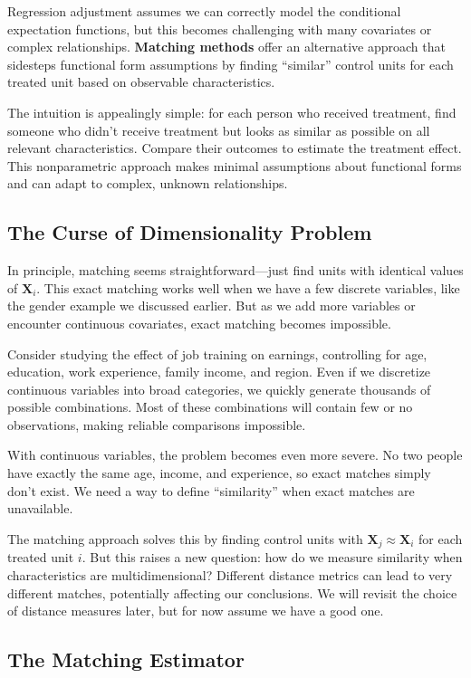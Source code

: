 \documentclass[12pt]{article}
\begin{document}
\begin{multicols}{2}
Regression adjustment assumes we can correctly model the conditional expectation functions, but this becomes challenging with many covariates or complex relationships.
\textbf{Matching methods} offer an alternative approach that sidesteps functional form assumptions by finding ``similar'' control units for each treated unit based on observable characteristics.

The intuition is appealingly simple: for each person who received treatment, find someone who didn't receive treatment but looks as similar as possible on all relevant characteristics.
Compare their outcomes to estimate the treatment effect.
This nonparametric approach makes minimal assumptions about functional forms and can adapt to complex, unknown relationships.

\subsection*{The Curse of Dimensionality Problem}

In principle, matching seems straightforward---just find units with identical values of $\bm{X}_i$.
This exact matching works well when we have a few discrete variables, like the gender example we discussed earlier.
But as we add more variables or encounter continuous covariates, exact matching becomes impossible.

Consider studying the effect of job training on earnings, controlling for age, education, work experience, family income, and region.
Even if we discretize continuous variables into broad categories, we quickly generate thousands of possible combinations.
Most of these combinations will contain few or no observations, making reliable comparisons impossible.

With continuous variables, the problem becomes even more severe.
No two people have exactly the same age, income, and experience, so exact matches simply don't exist.
We need a way to define ``similarity'' when exact matches are unavailable.

The matching approach solves this by finding control units with $\bm{X}_j \approx \bm{X}_i$ for each treated unit $i$.
But this raises a new question: how do we measure similarity when characteristics are multidimensional?
Different distance metrics can lead to very different matches, potentially affecting our conclusions.
We will revisit the choice of distance measures later, but for now assume we have a good one.

\subsection*{The Matching Estimator}


\end{multicols}
\end{document}
